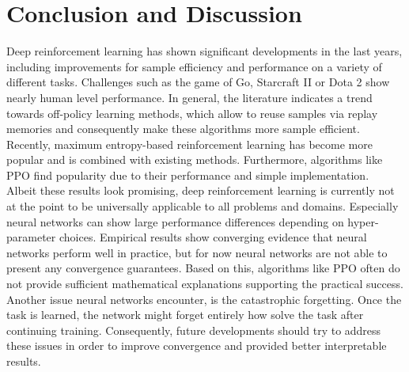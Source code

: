     \section{Conclusion and Discussion \label{sec:discussion}}
    Deep reinforcement learning has shown significant developments in the last years, including improvements for sample efficiency and performance on a variety of different tasks. 
    Challenges such as the game of Go, Starcraft II or Dota 2 show nearly human level performance.
    In general, the literature indicates a trend towards off-policy learning methods, which allow to reuse samples via replay memories and consequently make these algorithms more sample efficient.
    Recently, maximum entropy-based reinforcement learning has become more popular and is combined with existing methods. 
    Furthermore, algorithms like PPO find popularity due to their performance and simple  implementation.\\
    Albeit these results look promising, deep reinforcement learning is currently not at the point to be universally applicable to all problems and domains. 
    Especially neural networks can show large performance differences depending on hyper-parameter choices. 
    Empirical results show converging evidence that neural networks perform well in practice, but for now neural networks are not able to present any convergence guarantees.
    Based on this, algorithms like PPO often do not provide sufficient mathematical explanations supporting the practical success.
	Another issue neural networks encounter, is the catastrophic forgetting.
	Once the task is learned, the network might forget entirely how solve the task after continuing training. 
	Consequently, future developments should try to address these issues in order to improve convergence and provided better interpretable results.

    




